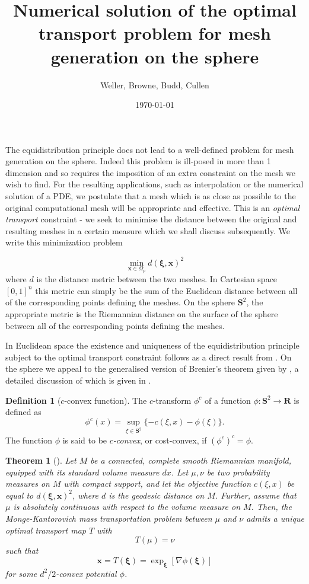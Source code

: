 \documentclass{article}
\author[1,*]{Weller, Browne, Budd, Cullen}
\title{Numerical solution of the optimal transport problem for mesh generation on the sphere}
\date{\today}
\newtheorem{theorem}{Theorem}
\theoremstyle{definition}
\newtheorem{defn}{Definition}
\begin{document}
\linenumbers
\maketitle

The equidistribution principle does not lead to a well-defined problem for mesh generation on the sphere. Indeed this problem is ill-posed in more than 1 dimension and so requires the imposition of an extra constraint on the mesh we wish to find. For the resulting applications, such as interpolation or the numerical solution of a PDE, we postulate that a mesh which is as close as possible to the original computational mesh will be appropriate and effective. This is an \emph{optimal transport} constraint - we seek to minimise the distance between the original and resulting meshes in a certain measure which we shall discuss subsequently. We write this minimization problem

\[\min_{\mathbf{x}\in \Omega_p} d(\mathbf{\xi},\mathbf{x})^2\]
where $d$ is the distance metric between the two meshes. In Cartesian space $[0,1]^n$ this metric can simply be the sum of the Euclidean distance between all of the corresponding points defining the meshes. On the sphere $\mathbf{S}^2$, the appropriate metric is the Riemannian distance on the surface of the sphere between all of the corresponding points defining the meshes.

In Euclidean space the existence and uniqueness of the equidistribution principle subject to the optimal transport constraint follows as a direct result from \citet{Brenier1991}. On the sphere we appeal to the generalised version of Brenier's theorem given by \citet{McCann2001}, a detailed discussion of which is given in \citet{villani2003}.

\begin{defn}[$c$-convex function]
The $c$-transform $\phi^c$ of a function $\phi: \mathbf{S}^2 \to \mathbf{R}$ is defined as 
\[\phi^c (x) = \sup_{\xi\in\mathbf{S}^2} \{-c(\xi,x) - \phi(\xi)\}.\]
The function $\phi$ is said to be \emph{$c$-convex}, or cost-convex, if 
$(\phi^c)^c=\phi.$
\end{defn}

\begin{theorem}[\citet{McCann2001}]\label{mccannthm}
Let $M$ be a connected, complete smooth Riemannian manifold, equipped with its standard volume measure $dx$. Let $\mu, \nu$ be two probability measures on $M$ with compact support, and let the objective function $c(\xi,x)$ be equal to $d(\mathbf{\xi},\mathbf{x})^2$, where $d$ is the geodesic distance on $M$. Further, assume that $\mu$ is absolutely continuous with respect to the volume measure on $M$. Then, the Monge-Kantorovich mass transportation problem between $\mu$ and $\nu$ admits a unique optimal transport map $T$ with
\begin{equation}\label{t1}T(\mu) = \nu\end{equation}
such that
\begin{equation}\label{t2}\mathbf{x}=T(\mathbf{\xi}) = \exp_\mathbf{\xi} [\nabla \phi(\mathbf{\xi})]\end{equation}
for some $d^2/2$-convex potential $\phi$. 
\end{theorem}
\end{document}
